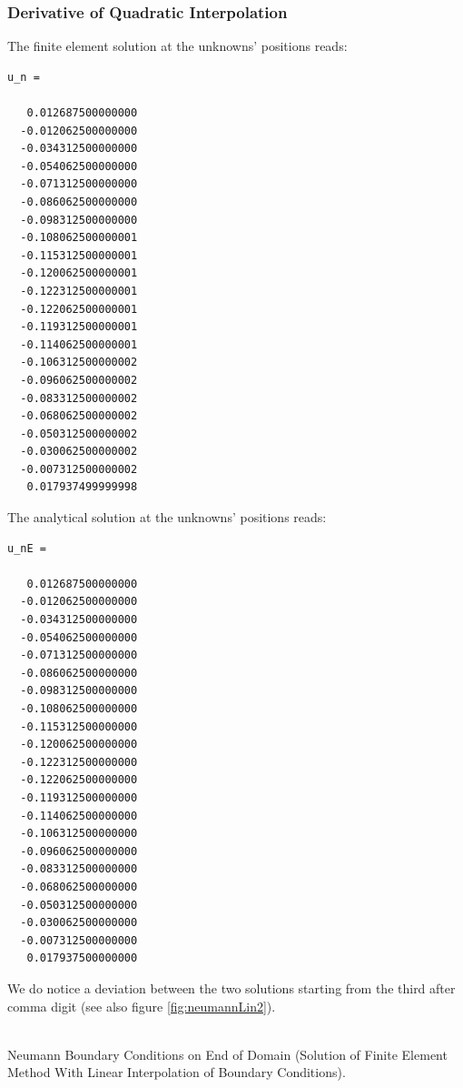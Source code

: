 \documentclass[a4paper,12pt]{article}
\makeatletter
\newenvironment{figurehere}
  {\def\@captype{figure}}
  {}
\makeatother
\begin{document}
\subsubsection{Derivative of Quadratic Interpolation}
The finite element solution at the unknowns' positions reads:
\begin{verbatim}
u_n =

   0.012687500000000
  -0.012062500000000
  -0.034312500000000
  -0.054062500000000
  -0.071312500000000
  -0.086062500000000
  -0.098312500000000
  -0.108062500000001
  -0.115312500000001
  -0.120062500000001
  -0.122312500000001
  -0.122062500000001
  -0.119312500000001
  -0.114062500000001
  -0.106312500000002
  -0.096062500000002
  -0.083312500000002
  -0.068062500000002
  -0.050312500000002
  -0.030062500000002
  -0.007312500000002
   0.017937499999998
\end{verbatim}
The analytical solution at the unknowns' positions reads:
\begin{verbatim}
u_nE =

   0.012687500000000
  -0.012062500000000
  -0.034312500000000
  -0.054062500000000
  -0.071312500000000
  -0.086062500000000
  -0.098312500000000
  -0.108062500000000
  -0.115312500000000
  -0.120062500000000
  -0.122312500000000
  -0.122062500000000
  -0.119312500000000
  -0.114062500000000
  -0.106312500000000
  -0.096062500000000
  -0.083312500000000
  -0.068062500000000
  -0.050312500000000
  -0.030062500000000
  -0.007312500000000
   0.017937500000000
\end{verbatim}
We do notice a deviation between the two solutions starting from the third after comma digit (see also figure \ref{fig:neumannLin2}).
\begin{center}
\begin{figurehere} 
\\
\caption{Neumann Boundary Conditions on End of Domain (Solution of Finite Element Method With Linear Interpolation of Boundary Conditions).}\label{fig:neumannLin2}
\end{figurehere}
\end{center}
\end{document}
